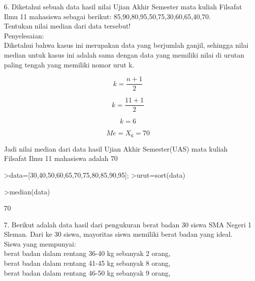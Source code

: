 \documentclass[12pt,Times new roman,letterpaper]{book}
\begin{document}
\begin{eulernootebook}
\begin{eulercomment}
\begin{eulercomment}
\begin{eulernootebook}
\begin{eulercomment}
\begin{eulercomment}
\begin{eulercomment}
\begin{eulercomment}
\begin{eulercomment}
\begin{eulercomment}
\begin{eulercomment}
\begin{eulercomment}
\begin{eulercomment}
\begin{eulercomment}
\begin{eulercomment}
\begin{eulercomment}
\begin{eulercomment}
\begin{eulercomment}
6. Diketahui sebuah data hasil nilai Ujian Akhir Semester mata kuliah
Filsafat Ilmu 11 mahasiswa sebagai berikut:
85,90,80,95,50,75,30,60,65,40,70.\\
Tentukan nilai median dari data tersebut!\\
Penyelesaian:\\
Diketahui bahwa kasus ini merupakan data yang berjumlah ganjil,
sehingga nilai median untuk kasus ini adalah sama dengan data yang
memiliki nilai di urutan paling tengah yang memiliki nomor urut k.\\
\end{eulercomment}
\begin{eulerformula}
\[
k = \frac{n+1}{2}
\]
\end{eulerformula}
\begin{eulerformula}
\[
k = \frac{11+1}{2}
\]
\end{eulerformula}
\begin{eulerformula}
\[
k = 6
\]
\end{eulerformula}
\begin{eulerformula}
\[
Me = X_6 = 70
\]
\end{eulerformula}
\begin{eulercomment}
Jadi nilai median dari data hasil Ujian Akhir Semester(UAS) mata
kuliah Filsafat Ilmu 11 mahasiswa adalah 70
\end{eulercomment}
\begin{eulerprompt}
>data=[30,40,50,60,65,70,75,80,85,90,95];
>urut=sort(data)
\end{eulerprompt}
\begin{euleroutput}
  [30,  40,  50,  60,  65,  70,  75,  80,  85,  90,  95]
\end{euleroutput}
\begin{eulerprompt}
>median(data)
\end{eulerprompt}
\begin{euleroutput}
  70
\end{euleroutput}
\begin{eulercomment}
7. Berikut adalah data hasil dari pengukuran berat badan 30 siswa SMA
Negeri 1 Sleman. Dari ke 30 siswa, mayoritas siswa memiliki berat
badan yang ideal.\\
Siswa yang mempunyai:\\
berat badan dalam rentang 36-40 kg sebanyak 2 orang,  \\
berat badan dalam rentang 41-45 kg sebanyak 8 orang,\\
berat badan dalam rentang 46-50 kg sebanyak 9 orang,\\

\end{eulercomment}
\end{eulercomment}
\end{eulercomment}
\end{eulercomment}
\end{eulercomment}
\end{eulercomment}
\end{eulercomment}
\end{eulercomment}
\end{eulercomment}
\end{eulercomment}
\end{eulercomment}
\end{eulercomment}
\end{eulercomment}
\end{eulercomment}
\end{eulernootebook}
\end{eulercomment}
\end{eulercomment}
\end{eulernootebook}
\end{document}
